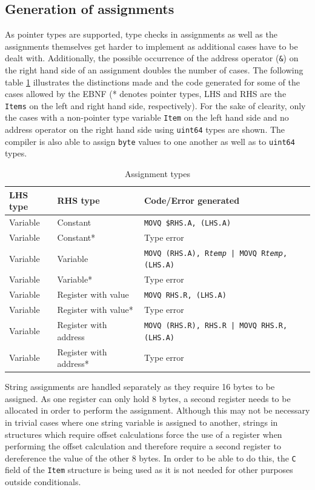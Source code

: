 \documentclass[a4paper]{scrartcl}
\let\section\subsection
\let\subsection\subsubsection
\let\subsubsection\paragraph
\let\paragraph\subparagraph
\let\subparagraph\undefined
\begin{document}
    \section{Generation of assignments}
      As pointer types are supported, type checks in assignments as well as the assignments themselves get harder to implement as additional cases have to be dealt with. Additionally, the possible occurrence of the address operator (\texttt{\&}) on the right hand side of an assignment doubles the number of cases. The following table \ref{tbl:assigntypes} illustrates the distinctions made and the code generated for some of the cases allowed by the EBNF (* denotes pointer types, LHS and RHS are the \texttt{Items} on the left and right hand side, respectively). For the sake of clearity, only the cases with a non-pointer type variable \texttt{Item} on the left hand side and no address operator on the right hand side using \texttt{uint64} types are shown. The compiler is also able to assign \texttt{byte} values to one another as well as to \texttt{uint64} types.

      \begin{table}[htb]
      \begin{tabular}{lll}
        \toprule
        \textbf{LHS type} & \textbf{RHS type} & \textbf{Code/Error generated}\\
        \midrule
        Variable & Constant & \texttt{MOVQ \$RHS.A, (LHS.A)}\\
        Variable & Constant* & Type error\\
        Variable & Variable & \texttt{MOVQ (RHS.A), R\textit{temp} | MOVQ R\textit{temp}, (LHS.A)}\\
        Variable & Variable* & Type error\\
        Variable & Register with value & \texttt{MOVQ RHS.R, (LHS.A)}\\
        Variable & Register with value* & Type error\\
        Variable & Register with address & \texttt{MOVQ (RHS.R), RHS.R | MOVQ RHS.R, (LHS.A)}\\
        Variable & Register with address* & Type error\\
        \bottomrule
      \end{tabular}
      \caption{Assignment types}
      \label{tbl:assigntypes}
      \end{table}
      
      String assignments are handled separately as they require 16 bytes to be assigned. As one register can only hold 8 bytes, a second register needs to be allocated in order to perform the assignment. Although this may not be necessary in trivial cases where one string variable is assigned to another, strings in structures which require offset calculations force the use of a register when performing the offset calculation and therefore require a second register to dereference the value of the other 8 bytes. In order to be able to do this, the \texttt{C} field of the \texttt{Item} structure is being used as it is not needed for other purposes outside conditionals.
\end{document}
